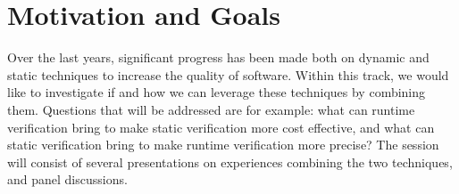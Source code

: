 
\section{Motivation and Goals}

Over the last years, significant progress has been made both on dynamic and static techniques to increase the quality of software. Within this track, we would like to investigate if and how we can leverage these techniques by combining them. Questions that will be addressed are for example: what can runtime verification bring to make static verification more cost effective, and what can static verification bring to make runtime verification more precise? The session will consist of several presentations on experiences combining the two techniques, and panel discussions.

